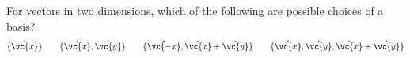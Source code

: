 For vectors in two dimensions, which of the following are possible
choices of a basis?
\begin{equation*}
  \{\hat{\vc{x}}\} \qquad
  \{\hat{\vc{x}},\hat{\vc{y}}\} \qquad
  \{\hat{\vc{-x}},\hat{\vc{x}}+\hat{\vc{y}}\} \qquad
  \{\hat{\vc{x}},\hat{\vc{y}},\hat{\vc{x}}+\hat{\vc{y}}\} 
\end{equation*}
